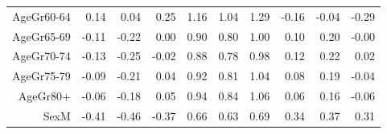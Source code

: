 \begin{table}[ht]
\begin{tabular}{rrrrrrrrrr}
  AgeGr60-64 & 0.14 & 0.04 & 0.25 & 1.16 & 1.04 & 1.29 & -0.16 & -0.04 & -0.29 \\ 
  AgeGr65-69 & -0.11 & -0.22 & 0.00 & 0.90 & 0.80 & 1.00 & 0.10 & 0.20 & -0.00 \\ 
  AgeGr70-74 & -0.13 & -0.25 & -0.02 & 0.88 & 0.78 & 0.98 & 0.12 & 0.22 & 0.02 \\ 
  AgeGr75-79 & -0.09 & -0.21 & 0.04 & 0.92 & 0.81 & 1.04 & 0.08 & 0.19 & -0.04 \\ 
  AgeGr80+ & -0.06 & -0.18 & 0.05 & 0.94 & 0.84 & 1.06 & 0.06 & 0.16 & -0.06 \\ 
  SexM & -0.41 & -0.46 & -0.37 & 0.66 & 0.63 & 0.69 & 0.34 & 0.37 & 0.31 \\ 
   \hline
\end{tabular}
\end{table}
